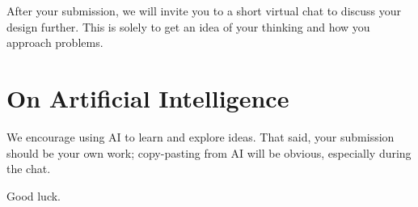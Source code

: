\documentclass[11pt, a4paper]{article}
\begin{document}
After your submission, we will invite you to a short virtual chat to discuss your design further. This is solely to get an idea of your thinking and how you approach problems.

\section{On Artificial Intelligence}

We encourage using AI to learn and explore ideas. That said, your submission should be your own work; copy-pasting from AI will be obvious, especially during the chat.
 
\vspace{1.5em}
 
\begin{center}
    \textcolor{uwmuted}{\small Good luck.}
\end{center}
 
\end{document}
